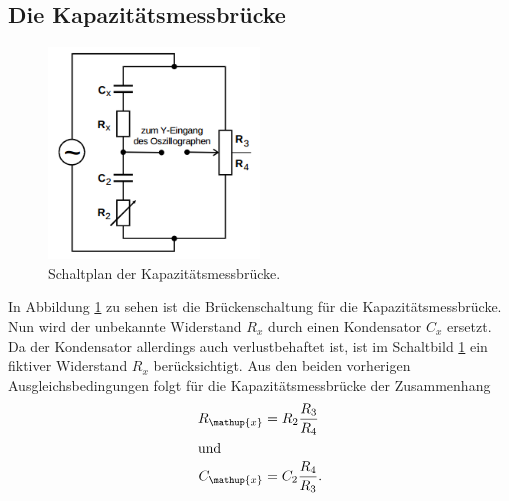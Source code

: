 \documentclass[
  bibliography=totoc,     %
  captions=tableheading,  %
  titlepage=firstiscover, %
]{scrartcl}
\begin{document}
\subsection{Die Kapazitätsmessbrücke}
\begin{figure}[htb]
  \centering
  \includegraphics[width=0.5\textwidth]{V3023.png}
  \caption{Schaltplan der Kapazitätsmessbrücke. \cite{anleitung}}
  \label{fig:V3023}
\end{figure}
In Abbildung \ref{fig:V3023} zu sehen ist die Brückenschaltung für die
Kapazitätsmessbrücke. Nun wird der unbekannte Widerstand $R_x$ durch einen
Kondensator $C_x$ ersetzt. Da der Kondensator allerdings auch verlustbehaftet
ist, ist im Schaltbild \ref{fig:V3023} ein fiktiver Widerstand $R_x$
berücksichtigt. Aus den beiden vorherigen Ausgleichsbedingungen folgt für
die Kapazitätsmessbrücke der Zusammenhang
\begin{align}
    \label{eqn:kapazitätsmessbrücke_R}
    R_{\mathup{x}} &= R_2 \frac{R_3}{R_4} \\
    \shortintertext{und}
    \label{eqn:kapazitätsmessbrücke_C}
    C_{\mathup{x}} &= C_2 \frac{R_4}{R_3}.
\end{align}

\newpage
\end{document}
